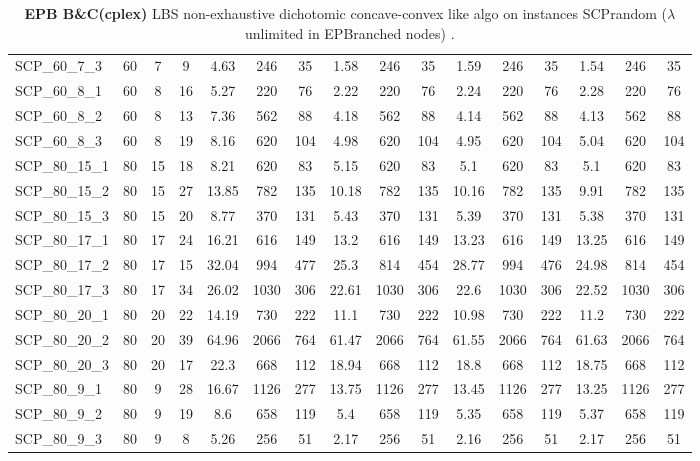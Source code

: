 \begin{sidewaystable}[!ht]
{\begin{tabular}{lccccccccccccccc}
SCP\_60\_7\_3 & 60 & 7 & 9 & 4.63 & 246 & 35 & 1.58 & 246 & 35 & 1.59 & 246 & 35 & 1.54 & 246 & 35 \\
SCP\_60\_8\_1 & 60 & 8 & 16 & 5.27 & 220 & 76 & 2.22 & 220 & 76 & 2.24 & 220 & 76 & 2.28 & 220 & 76 \\
SCP\_60\_8\_2 & 60 & 8 & 13 & 7.36 & 562 & 88 & 4.18 & 562 & 88 & 4.14 & 562 & 88 & 4.13 & 562 & 88 \\
SCP\_60\_8\_3 & 60 & 8 & 19 & 8.16 & 620 & 104 & 4.98 & 620 & 104 & 4.95 & 620 & 104 & 5.04 & 620 & 104 \\
SCP\_80\_15\_1 & 80 & 15 & 18 & 8.21 & 620 & 83 & 5.15 & 620 & 83 &  \textcolor{blue2}{5.1} & 620 & 83 &  \textcolor{blue2}{5.1} & 620 & 83 \\
SCP\_80\_15\_2 & 80 & 15 & 27 & 13.85 & 782 & 135 & 10.18 & 782 & 135 & 10.16 & 782 & 135 &  \textcolor{blue2}{9.91} & 782 & 135 \\
SCP\_80\_15\_3 & 80 & 15 & 20 & 8.77 & 370 & 131 & 5.43 & 370 & 131 & 5.39 & 370 & 131 &  \textcolor{blue2}{5.38} & 370 & 131 \\
SCP\_80\_17\_1 & 80 & 17 & 24 & 16.21 & 616 & 149 & 13.2 & 616 & 149 & 13.23 & 616 & 149 & 13.25 & 616 & 149 \\
SCP\_80\_17\_2 & 80 & 17 & 15 & 32.04 & 994 & 477 & 25.3 & 814 & 454 & 28.77 & 994 & 476 &  \textcolor{blue2}{24.98} & 814 & 454 \\
SCP\_80\_17\_3 & 80 & 17 & 34 & 26.02 & 1030 & 306 & 22.61 & 1030 & 306 & 22.6 & 1030 & 306 &  \textcolor{blue2}{22.52} & 1030 & 306 \\
SCP\_80\_20\_1 & 80 & 20 & 22 & 14.19 & 730 & 222 & 11.1 & 730 & 222 & 10.98 & 730 & 222 & 11.2 & 730 & 222 \\
SCP\_80\_20\_2 & 80 & 20 & 39 & 64.96 & 2066 & 764 &  \textcolor{blue2}{61.47} & 2066 & 764 & 61.55 & 2066 & 764 & 61.63 & 2066 & 764 \\
SCP\_80\_20\_3 & 80 & 20 & 17 & 22.3 & 668 & 112 & 18.94 & 668 & 112 & 18.8 & 668 & 112 & 18.75 & 668 & 112 \\
SCP\_80\_9\_1 & 80 & 9 & 28 & 16.67 & 1126 & 277 & 13.75 & 1126 & 277 & 13.45 & 1126 & 277 & 13.25 & 1126 & 277 \\
SCP\_80\_9\_2 & 80 & 9 & 19 & 8.6 & 658 & 119 & 5.4 & 658 & 119 &  \textcolor{blue2}{5.35} & 658 & 119 & 5.37 & 658 & 119 \\
SCP\_80\_9\_3 & 80 & 9 & 8 & 5.26 & 256 & 51 & 2.17 & 256 & 51 & 2.16 & 256 & 51 & 2.17 & 256 & 51 \\
\bottomrule
\end{tabular}
}%
\caption{\textbf{EPB B\&C(cplex) }LBS non-exhaustive dichotomic concave-convex like algo on instances SCPrandom ($\lambda$ unlimited in EPBranched nodes) .}
\label{tab:table_lambda_EPB_SCPrandom }
\end{sidewaystable}

